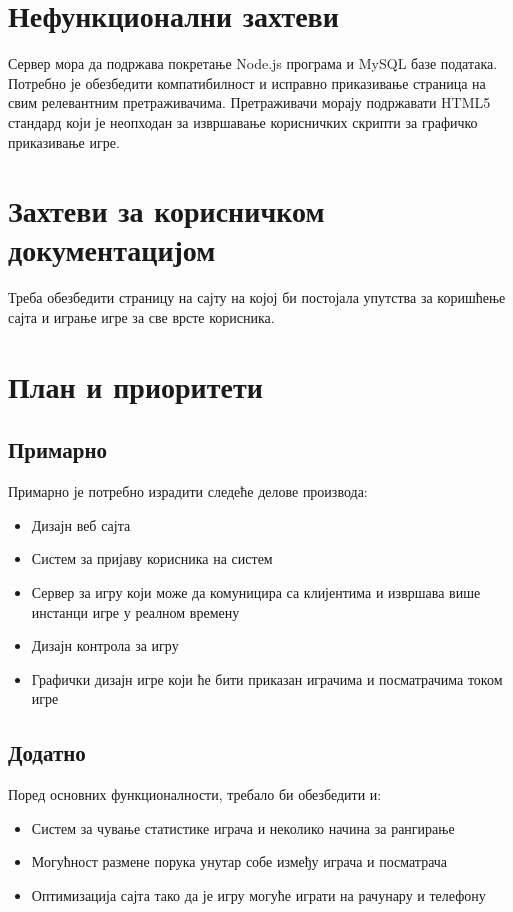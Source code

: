 \section{Нефункционални захтеви}
Сервер мора да подржава покретање Node.js програма и MySQL базе података. Потребно је обезбедити компатибилност 
и исправно приказивање страница на свим релевантним претраживачима. Претраживачи морају подржавати HTML5 стандард
који је неопходан за извршавање корисничких скрипти за графичко приказивање игре.



\section{Захтеви за корисничком документацијом}
Треба обезбедити страницу на сајту на којој би постојала упутства за коришћење сајта и играње игре за све врсте
корисника.



\section{План и приоритети}

\subsection{Примарно}
Примарно је потребно израдити следеће делове производа:
\begin{itemize}

\item Дизајн веб сајта

\item Систем за пријаву корисника на систем

\item Сервер за игру који може да комуницира са клијентима и извршава више инстанци игре у реалном времену

\item Дизајн контрола за игру

\item Графички дизајн игре који ће бити приказан играчима и посматрачима током игре

\end{itemize}

\subsection{Додатно}
Поред основних функционалности, требало би обезбедити и:
\begin{itemize}
    
    \item Систем за чување статистике играча и неколико начина за рангирање

    \item Могућност размене порука унутар собе између играча и посматрача

\item Оптимизација сајта тако да је игру могуће играти на рачунару и телефону    
\end{itemize}
